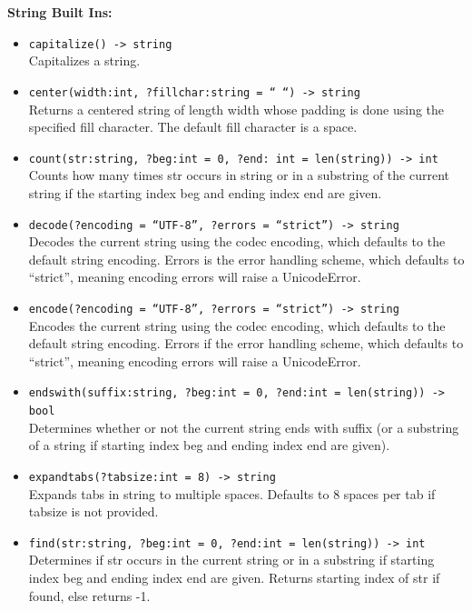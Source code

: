 \documentclass{article}
\begin{document}
\textbf{String Built Ins:}
\begin{itemize}
\item \verb|capitalize() -> string| \\
    Capitalizes a string. 

\item \verb|center(width:int, ?fillchar:string = “ “) -> string| \\
Returns a centered string of length width whose padding is done using the specified fill character. The default fill character is a space. 

\item \verb|count(str:string, ?beg:int = 0, ?end: int = len(string)) -> int| \\
Counts how many times str occurs in string or in a substring of the current string if the starting index beg and ending index end are given. 

\item \verb|decode(?encoding = “UTF-8”, ?errors = “strict”) -> string| \\
Decodes the current string using the codec encoding, which defaults to the default string encoding. Errors is the error handling scheme, which defaults to “strict”, meaning encoding errors will raise a UnicodeError. 

\item \verb|encode(?encoding = “UTF-8”, ?errors = “strict”) -> string| \\
Encodes the current string using the codec encoding, which defaults to the default string encoding. Errors if the error handling scheme, which defaults to “strict”, meaning encoding errors will raise a UnicodeError. 

\item \verb|endswith(suffix:string, ?beg:int = 0, ?end:int = len(string)) -> bool| \\
Determines whether or not the current string ends with suffix (or a substring of a string if starting index beg and ending index end are given). 

\item \verb|expandtabs(?tabsize:int = 8) -> string| \\
Expands tabs in string to multiple spaces. Defaults to 8 spaces per tab if tabsize is not provided. 

\item \verb|find(str:string, ?beg:int = 0, ?end:int = len(string)) -> int| \\
Determines if str occurs in the current string or in a substring if starting index beg and ending index end are given. Returns starting index of str if found, else returns -1. 


\end{itemize}
\end{document}
